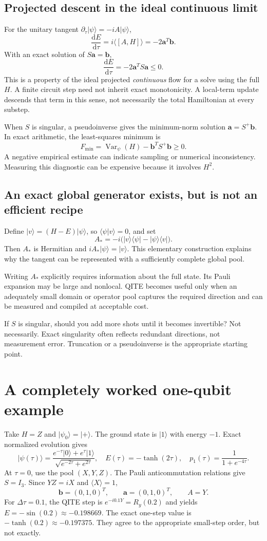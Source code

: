 \documentclass[11pt,a4paper]{article}
\newcommand{\ket}[1]{\lvert #1\rangle}
\newcommand{\bra}[1]{\langle #1\rvert}
\newcommand{\braket}[2]{\langle #1\vert #2\rangle}
\newcommand{\ex}[1]{\langle #1\rangle}
\newcommand{\Var}{\operatorname{Var}}
\newcommand{\dd}{\mathrm{d}}
\newcommand{\dt}{\Delta\tau}
\newcommand{\lesson}[2]{\clearpage\section{#1}\label{#2}}
\newcommand{\checkpoint}[1]{\begin{idea}[Pause and check]#1\end{idea}}
\begin{document}
\subsection*{Projected descent in the ideal continuous limit}
For the unitary tangent $\partial_\tau\ket{\psi}=-iA\ket{\psi}$,
\[
\frac{\dd E}{\dd\tau}=i\ex{[A,H]}=-2\bm a^T\bm b.
\]
With an exact solution of $S\bm a=\bm b$,
\[
\frac{\dd E}{\dd\tau}=-2\bm a^TS\bm a\le0.
\]
This is a property of the ideal projected \emph{continuous} flow for a solve using the full $H$. A finite circuit step need not inherit exact monotonicity. A local-term update descends that term in this sense, not necessarily the total Hamiltonian at every substep.

When $S$ is singular, a pseudoinverse gives the minimum-norm solution $\bm a=S^+\bm b$. In exact arithmetic, the least-squares minimum is
\[
F_{\min}=\Var_\psi(H)-\bm b^TS^+\bm b\ge0.
\]
A negative empirical estimate can indicate sampling or numerical inconsistency. Measuring this diagnostic can be expensive because it involves $H^2$.

\subsection*{An exact global generator exists, but is not an efficient recipe}
Define $\ket{v}=(H-E)\ket{\psi}$, so $\braket{\psi}{v}=0$, and set
\[
A_*=-i\bigl(\ket{v}\bra{\psi}-\ket{\psi}\bra{v}\bigr).
\]
Then $A_*$ is Hermitian and $iA_*\ket{\psi}=\ket{v}$. This elementary construction explains why the tangent can be represented with a sufficiently complete global pool.

\begin{idea}
Writing $A_*$ explicitly requires information about the full state. Its Pauli expansion may be large and nonlocal. QITE becomes useful only when an adequately small domain or operator pool captures the required direction and can be measured and compiled at acceptable cost.
\end{idea}

\checkpoint{If $S$ is singular, should you add more shots until it becomes invertible? Not necessarily. Exact singularity often reflects redundant directions, not measurement error. Truncation or a pseudoinverse is the appropriate starting point.}

\lesson{A completely worked one-qubit example}{sec:onequbit}
Take $H=Z$ and $\ket{\psi_0}=\ket{+}$. The ground state is $\ket{1}$ with energy $-1$. Exact normalized evolution gives
\[
\ket{\psi(\tau)}=\frac{e^{-\tau}\ket{0}+e^{\tau}\ket{1}}
{\sqrt{e^{-2\tau}+e^{2\tau}}},\quad
E(\tau)=-\tanh(2\tau),\quad p_1(\tau)=\frac{1}{1+e^{-4\tau}}.
\]
At $\tau=0$, use the pool $(X,Y,Z)$. The Pauli anticommutation relations give $S=I_3$. Since $YZ=iX$ and $\ex{X}=1$,
\[
\bm b=(0,1,0)^T,\qquad\bm a=(0,1,0)^T,\qquad A=Y.
\]
For $\dt=0.1$, the QITE step is $e^{-i0.1Y}=R_y(0.2)$ and yields $E=-\sin(0.2)\approx-0.198669$. The exact one-step value is $-\tanh(0.2)\approx-0.197375$. They agree to the appropriate small-step order, but not exactly.
\end{document}
